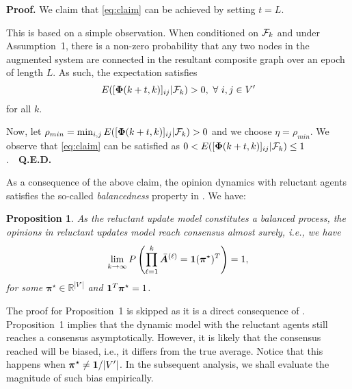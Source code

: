 \documentclass[letter]{article}
\newtheorem{prop}{Proposition}
\theoremstyle{remark}
\begin{document}

\textbf{Proof.} 
We claim that \eqref{eq:claim} can be achieved by setting $t = L$. 

This is based on a simple observation. When conditioned on ${\cal F}_k$ and under Assumption~1, there is a non-zero probability that any two nodes in the augmented system are connected in the resultant composite graph over an epoch of length $L$. As such, the expectation satisfies $$E( [{\bf \Phi} (k+t,k)]_{ij} | {\cal F}_k ) > 0,~\forall~i,j \in V'$$
for all $k$. 

Now, let $\rho_{min} = \min_{i,j} E( [{\bf \Phi} (k+t,k)]_{ij} | {\cal F}_k ) > 0$ and we choose $\eta = \rho_{min}$. We observe that \eqref{eq:claim} can be satisfied as $0 < E( [{\bf \Phi} (k+t,k)]_{ij} | {\cal F}_k ) \leq 1$.~\hfill~{\bf Q.E.D.}

As a consequence of the above claim, the opinion dynamics with reluctant agents satisfies the so-called \emph{balancedness} property in \cite{Touri2014}. We have:
\begin{prop}
As the reluctant update model constitutes a balanced process, the opinions in reluctant updates model reach consensus almost surely, i.e., we have
\begin{equation} \label{eq:propo}
\lim_{k \rightarrow \infty} P \left( \prod_{\ell=1}^{k} \bar{\bm A}^{(\ell)} = {\bf 1} ({\bm \pi}^\star)^T \right) = 1,
\end{equation}
for some ${\bm \pi}^\star \in \mathbb{R}^{|V'|}$ and ${\bf 1}^T {\bm \pi}^\star = 1$.
\end{prop}

The proof for Proposition~1 is skipped as it is a direct consequence of \cite{Touri2014}.
Proposition~1 implies that the dynamic model with the reluctant agents still reaches a consensus asymptotically. However, it is likely that the consensus reached will be biased, i.e., it differs from the true average. Notice that this happens when ${\bm \pi}^\star \neq {\bf 1} / |V'|$. In the subsequent analysis, we shall evaluate the magnitude of such bias empirically. 
\end{document}
